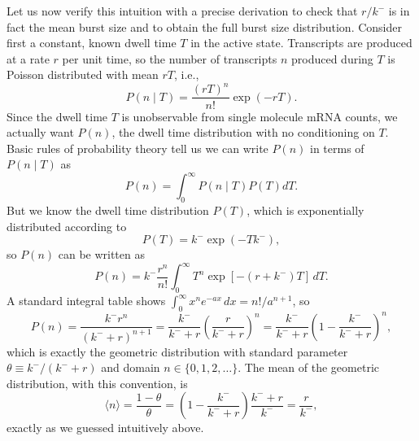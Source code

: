 Let us now verify this intuition with a precise derivation to check that $r/k^-$
is in fact the mean burst size and to obtain the full burst size distribution.
Consider first a constant, known dwell time $T$ in the active state. Transcripts
are produced at a rate $r$ per unit time, so the number of transcripts $n$
produced during $T$ is Poisson distributed with mean $rT$, i.e.,
\begin{equation}
    P(n\mid T) = \frac{(rT)^n}{n!} \exp(-rT).
\end{equation}
Since the dwell time $T$ is unobservable from single molecule mRNA counts, we
actually want $P(n)$, the dwell time distribution with no conditioning on $T$.
Basic rules of probability theory tell us we can write $P(n)$ in terms of
$P(n\mid T)$ as
\begin{equation}
    P(n) =\int_0^\infty P(n\mid T) P(T) dT.
\end{equation}
But we know the dwell time distribution $P(T)$, which is exponentially
distributed according to
\begin{equation}
    P(T) = k^- \exp(-T k^-),
\end{equation}
so $P(n)$ can be written as
\begin{equation}
    P(n) = k^- \frac{r^n}{n!}
            \int_0^\infty T^n\exp[-(r + k^-)T]\,dT.
\end{equation}
A standard integral table shows $\int_0^\infty x^n e^{-ax}\,dx = n!/a^{n+1}$, so
\begin{equation}
    P(n) = \frac{k^- r^n}{(k^- + r)^{n+1}}
        = \frac{k^-}{k^- + r}
            \left(\frac{r}{k^- + r}\right)^n
        = \frac{k^-}{k^- + r}
            \left(1 - \frac{k^-}{k^- + r}\right)^n,
\end{equation}
which is exactly the geometric distribution with standard parameter
$\theta\equiv k^-/(k^- + r)$ and domain $n \in \{0, 1, 2, \dots\}$.
The mean of the geometric distribution, with this convention, is
\begin{equation}
\langle n\rangle = \frac{1 - \theta}{\theta}
        = \left(1 - \frac{k^-}{k^- + r}\right)
                    \frac{k^- + r}{k^-}
        = \frac{r}{k^-},
\end{equation}
exactly as we guessed intuitively above.


